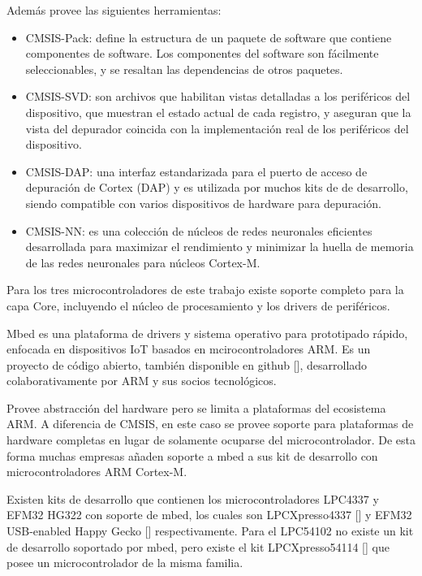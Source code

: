Además provee las siguientes herramientas:

\begin{itemize}
\item
CMSIS-Pack: define la estructura de un paquete de software que contiene componentes de software. Los componentes del software son fácilmente seleccionables, y se resaltan las dependencias de otros paquetes.
\item
CMSIS-SVD: son archivos que habilitan vistas detalladas a los periféricos del dispositivo, que muestran el estado actual de cada registro, y aseguran que la vista del depurador coincida con la implementación real de los periféricos del dispositivo.
\item
CMSIS-DAP: una interfaz estandarizada para el puerto de acceso de depuración de Cortex (DAP) y es utilizada por muchos kits de de desarrollo, siendo compatible con varios dispositivos de hardware para depuración.
\item
CMSIS-NN: es una colección de núcleos de redes neuronales eficientes desarrollada para maximizar el rendimiento y minimizar la huella de memoria de las redes neuronales para núcleos Cortex-M.
\end{itemize}

Para los tres microcontroladores de este trabajo existe soporte completo para la capa Core, incluyendo el núcleo de procesamiento y los drivers de periféricos.


Mbed es una plataforma de drivers y sistema operativo para prototipado rápido, enfocada en dispositivos IoT basados en mcirocontroladores ARM. Es un proyecto de código abierto, también disponible en github [], desarrollado colaborativamente por ARM y sus socios tecnológicos.

Provee abstracción del hardware pero se limita a plataformas del ecosistema ARM. A diferencia de CMSIS, en este caso se provee soporte para plataformas de hardware completas en lugar de solamente ocuparse del microcontrolador. De esta forma muchas empresas añaden soporte a mbed a sus kit de desarrollo con microcontroladores ARM Cortex-M. 

Existen kits de desarrollo que contienen los microcontroladores LPC4337 y EFM32 HG322 con soporte de mbed, los cuales son LPCXpresso4337 [] y EFM32 USB-enabled Happy Gecko [] respectivamente. Para el LPC54102 no existe un kit de desarrollo soportado por mbed, pero existe el kit LPCXpresso54114 [] que posee un  microcontrolador de la misma familia.

